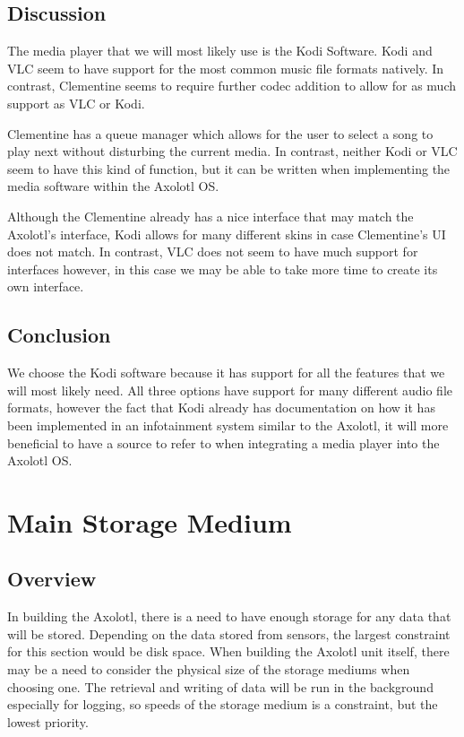 \documentclass[onecolumn, draftclsnofoot,10pt, compsoc]{IEEEtran}
\begin{document}
\subsection{Discussion}
The media player that we will most likely use is the Kodi Software.
Kodi and VLC seem to have support for the most common music file formats natively.
In contrast, Clementine seems to require further codec addition to allow for as
much support as VLC or Kodi. 

Clementine has a queue manager which allows for the user to select a song to play
next without disturbing the current media. In contrast, neither Kodi or VLC seem to
have this kind of function, but it can be written when implementing the media
software within the Axolotl OS. 

Although the Clementine already has a nice interface that may match the Axolotl's
interface, Kodi allows for many different skins in case Clementine's UI does not
match. In contrast, VLC does not seem to have much support for interfaces however, 
in this case we may be able to take more time to create its own interface.

\subsection{Conclusion}
We choose the Kodi software because it has support for all the features that we will most likely need. All three options have support for many different audio file formats, however the fact that Kodi already has documentation on how it has been implemented in an infotainment system similar to the Axolotl, it will more beneficial to have a source to refer to when integrating a media player into the Axolotl OS. 

\section{Main Storage Medium}
\subsection{Overview}
In building the Axolotl, there is a need to have enough storage for any data that will be stored. Depending on the data stored from sensors, the largest constraint for this section would be disk space. When building the Axolotl unit itself, there may be a need to consider the physical size of the storage mediums when choosing one. The retrieval and writing of data will be run in the background especially for logging, so speeds of the storage medium is a constraint, but the lowest priority.
\end{document}

